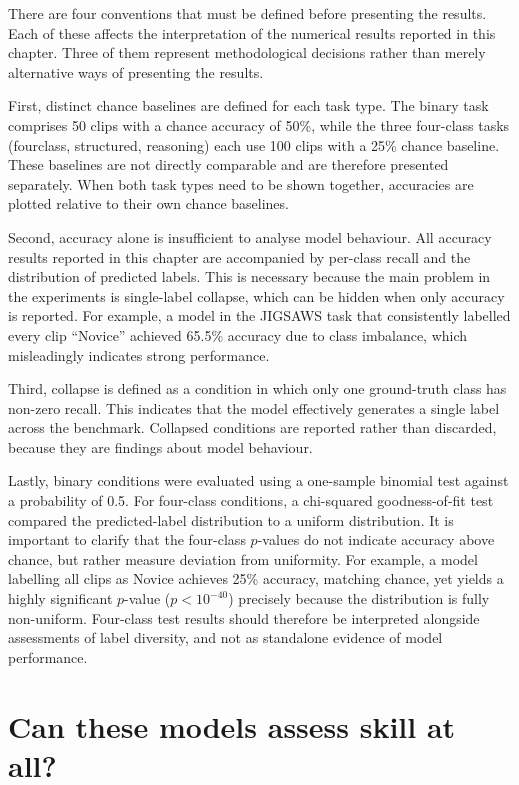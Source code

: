 \documentclass[logo,msc]{infthesis}
\begin{document}
There are four conventions that must be defined before presenting the
results. Each of these affects the interpretation of the numerical results
reported in this chapter. Three of them represent methodological decisions
rather than merely alternative ways of presenting the results.

First, distinct chance baselines are defined for each task type. The binary
task comprises 50 clips with a chance accuracy of 50\%, while the three
four-class tasks (fourclass, structured, reasoning) each use 100 clips with
a 25\% chance baseline. These baselines are not directly comparable and are
therefore presented separately. When both task types need to be shown
together, accuracies are plotted relative to their own chance baselines.

Second, accuracy alone is insufficient to analyse model behaviour. All
accuracy results reported in this chapter are accompanied by per-class
recall and the distribution of predicted labels. This is necessary because
the main problem in the experiments is single-label collapse, which can be
hidden when only accuracy is reported. For example, a model in the JIGSAWS
task that consistently labelled every clip ``Novice'' achieved 65.5\%
accuracy due to class imbalance, which misleadingly indicates strong
performance.

Third, collapse is defined as a condition in which only one ground-truth
class has non-zero recall. This indicates that the model effectively
generates a single label across the benchmark. Collapsed conditions are
reported rather than discarded, because they are findings about model
behaviour.

Lastly, binary conditions were evaluated using a one-sample binomial test
against a probability of 0.5. For four-class conditions, a chi-squared
goodness-of-fit test compared the predicted-label distribution to a uniform
distribution. It is important to clarify that the four-class $p$-values do
not indicate accuracy above chance, but rather measure deviation from
uniformity. For example, a model labelling all clips as Novice achieves
25\% accuracy, matching chance, yet yields a highly significant $p$-value
($p < 10^{-40}$) precisely because the distribution is fully non-uniform.
Four-class test results should therefore be interpreted alongside
assessments of label diversity, and not as standalone evidence of model
performance.

\section{Can these models assess skill at all?}
\end{document}
